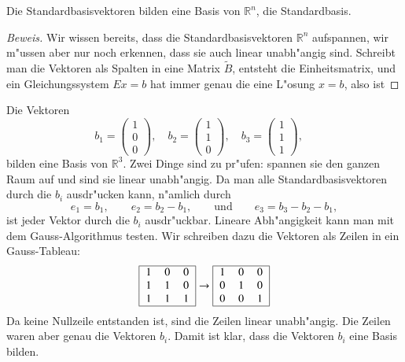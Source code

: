 \begin{satz}
Die Standardbasisvektoren bilden eine Basis von $\mathbb R^n$,
die Standardbasis.
\end{satz}

\begin{proof}[Beweis]
Wir wissen bereits, dass die Standardbasisvektoren $\mathbb R^n$ aufspannen,
wir m"ussen aber nur noch erkennen, dass sie auch linear unabh"angig sind.
Schreibt man die Vektoren als Spalten in eine Matrix $\tilde B$, entsteht die
Einheitsmatrix, und ein Gleichungssystem $Ex=b$ hat immer genau die eine
L"osung $x=b$, also ist 
\end{proof}

\begin{beispiel}
Die Vektoren 
\[
b_1=\begin{pmatrix}1\\0\\0\end{pmatrix},\quad
b_2=\begin{pmatrix}1\\1\\0\end{pmatrix},\quad
b_3=\begin{pmatrix}1\\1\\1\end{pmatrix},\quad
\]
bilden eine Basis von $\mathbb R^3$.
Zwei Dinge sind zu pr"ufen:
spannen sie den ganzen Raum auf und sind sie linear unabh"angig.
Da man alle Standardbasisvektoren durch die $b_i$ ausdr"ucken kann, n"amlich
durch
\[
e_1=b_1,\qquad e_2=b_2-b_1,\qquad\text{und}\qquad e_3=b_3-b_2-b_1,
\]
ist jeder Vektor durch die $b_i$ ausdr"uckbar.
Lineare Abh"angigkeit kann
man mit dem Gauss-Algorithmus testen.
Wir schreiben dazu die Vektoren
als Zeilen in ein Gauss-Tableau:
\[
\begin{tabular}{|>{$}c<{$}>{$}c<{$}>{$}c<{$}|}
\hline
1&0&0\\
1&1&0\\
1&1&1\\
\hline
\end{tabular}
\rightarrow
\begin{tabular}{|>{$}c<{$}>{$}c<{$}>{$}c<{$}|}
\hline
1&0&0\\
0&1&0\\
0&0&1\\
\hline
\end{tabular}
\]
Da keine Nullzeile entstanden ist, sind die Zeilen linear unabh"angig.
Die Zeilen waren aber genau die Vektoren $b_i$.
Damit ist klar, dass
die Vektoren $b_i$ eine Basis bilden.
\end{beispiel}

